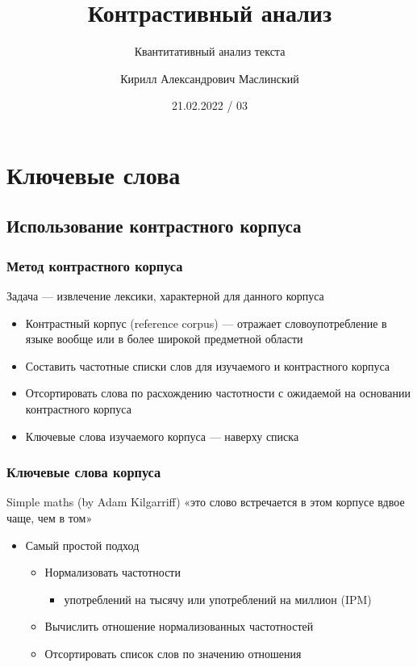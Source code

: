 \documentclass[svgnames]{beamer}
\title[CMTA 03] %
{Контрастивный анализ}
\subtitle
{Квантитативный анализ текста} %
\author%
{Кирилл Александрович Маслинский}
\institute%
{ЕУ СПб}
\date%
{21.02.2022 / 03}
\begin{document}
\begin{frame}
  \titlepage
\end{frame}

\section{Ключевые слова}

\subsection{Использование контрастного корпуса}

\begin{frame}
  \frametitle{Метод контрастного корпуса}
  Задача — извлечение лексики, характерной для данного корпуса
  \begin{itemize}
  \item Контрастный корпус (reference corpus) — отражает
    словоупотребление в языке вообще или в более широкой предметной
    области
  \item Составить частотные списки слов для изучаемого и контрастного
    корпуса
  \item Отсортировать слова по расхождению частотности с ожидаемой
    на основании контрастного корпуса
  \item Ключевые слова изучаемого корпуса — наверху списка
  \end{itemize}
\end{frame}


\begin{frame}
  \frametitle{Ключевые слова корпуса}
  \begin{block}{Simple maths (by Adam Kilgarriff)}
  «это слово встречается в этом корпусе вдвое чаще, чем в том»
\end{block}
\begin{itemize}
\item Самый простой подход
  \begin{itemize}
  \item Нормализовать частотности
    \begin{itemize}
    \item употреблений на тысячу или употреблений на миллион (IPM)
    \end{itemize}
  \item Вычислить отношение нормализованных частотностей
  \item Отсортировать список слов по значению отношения
  \end{itemize}
\end{itemize}
\end{frame}
\end{document}
